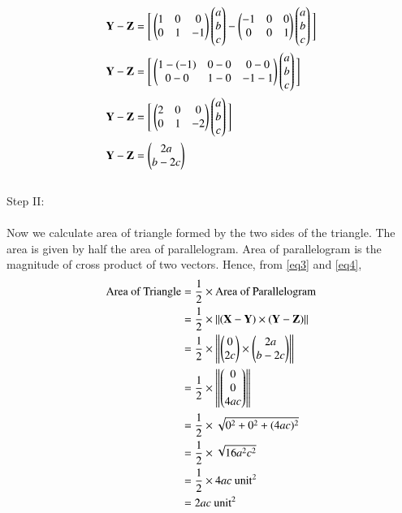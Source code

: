 \documentclass[journal,12pt]{IEEEtran}
\begin{document}
\begin{align}
\mathbf{Y-Z} & = \Bigg[\begin{pmatrix}1&0&0\\0&1&-1\end{pmatrix}\begin{pmatrix}a\\b\\c\end{pmatrix} - \begin{pmatrix}-1&0&0\\0&0&1\end{pmatrix}\begin{pmatrix}a\\b\\c\end{pmatrix}\Bigg] \\
\mathbf{Y-Z} & = \Bigg[\begin{pmatrix}1-(-1)&0-0&0-0\\0-0&1-0&-1-1\end{pmatrix}\begin{pmatrix}a\\b\\c\end{pmatrix}\Bigg] \\
\mathbf{Y-Z} & = \Bigg[\begin{pmatrix}2&0&0\\0&1&-2\end{pmatrix}\begin{pmatrix}a\\b\\c\end{pmatrix}\Bigg] \\
\mathbf{Y-Z} & = \begin{pmatrix}2a\\b-2c\end{pmatrix}
\label{eq4}
\end{align}\\
Step II:\\\\
Now we calculate area of triangle formed by the two sides of the triangle. The area is given by half the area of parallelogram. Area of parallelogram is the magnitude of cross product of two vectors. Hence, from \ref{eq3} and \ref{eq4},\\
\begin{align}
\text{Area of Triangle} & = \frac{1}{2} \times \text{Area of Parallelogram} \\
& = \frac{1}{2} \times \norm{\Vec{(X-Y)}\times\Vec{(Y-Z)}} \\
& = \frac{1}{2} \times \norm{\myvec{0\\2c} \times \myvec{2a\\b-2c}} \\
& = \frac{1}{2} \times \norm{\myvec{0\\0\\4ac}} \\
& = \frac{1}{2} \times \sqrt{0^2 + 0^2+ (4ac)^2} \\
& = \frac{1}{2} \times \sqrt{16a^2c^2} \\
& = \frac{1}{2} \times  4ac \text{ unit}^2 \\
& = 2ac \text{ unit}^2
\label{eq5}
\end{align}\\
\end{document}
